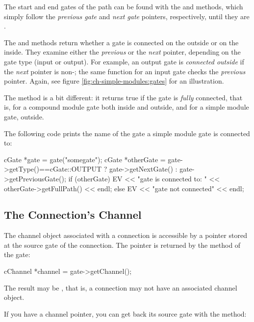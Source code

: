The start and end gates of the path can be found with the 
and  methods, which simply follow the \textit{previous gate} and
\textit{next gate} pointers, respectively, until they are .

The  and  methods
return whether a gate is connected on the outside or on the inside. They
examine either the \textit{previous} or the \textit{next} pointer, depending on the
gate type (input or output). For example, an output gate is \textit{connected outside}
if the \textit{next} pointer is non-; the same function for an input gate
checks the \textit{previous} pointer. Again, see figure \ref{fig:ch-simple-modules:gates}
for an illustration.

The  method is a bit different: it returns true if the gate
is \textit{fully} connected, that is, for a compound module gate
both inside and outside, and for a simple module gate, outside.

The following code prints the name of the gate a simple module gate is
connected to:

\begin{cpp}
cGate *gate = gate("somegate");
cGate *otherGate = gate->getType()==cGate::OUTPUT ? gate->getNextGate() :
                                                    gate->getPreviousGate();
if (otherGate)
  EV << "gate is connected to: " << otherGate->getFullPath() << endl;
else
  EV << "gate not connected" << endl;
\end{cpp}


\subsection{The Connection's Channel}
\label{sec:simple-modules:connections-channel}

The channel object associated with a connection is accessible by
a pointer stored at the source gate of the connection. The pointer
is returned by the  method of the gate:

\begin{cpp}
cChannel *channel = gate->getChannel();
\end{cpp}

The result may be , that is, a connection may not have
an associated channel object.

If you have a channel pointer, you can get back its source gate
with the  method:

